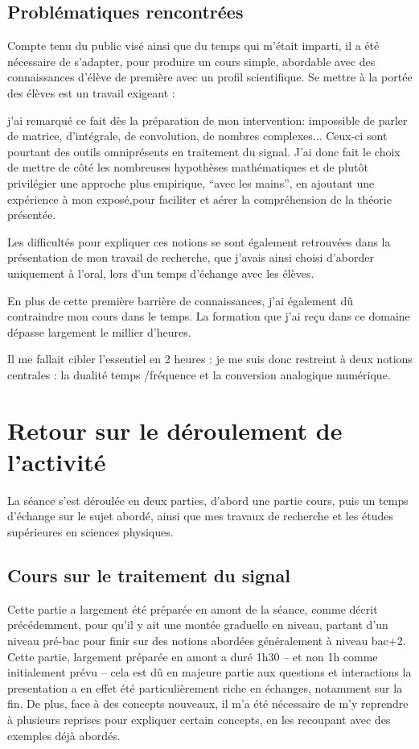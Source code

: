 \documentclass[12pt]{article}
\begin{document}
\subsection{Problématiques rencontrées}

Compte tenu du public visé ainsi que du temps qui m'était imparti, il a été nécessaire de s'adapter, pour produire un cours simple, abordable avec des connaissances d'élève de première avec un profil scientifique. Se mettre à la portée des élèves est un travail exigeant :

j'ai remarqué ce fait dès la préparation de mon intervention: impossible de parler de matrice, d'intégrale, de convolution, de nombres complexes...
Ceux-ci sont pourtant des outils omniprésents en traitement du signal.
J'ai donc fait le choix de mettre de côté les nombreuses hypothèses mathématiques et de plutôt privilégier une approche plus empirique, ``avec les mains'', en ajoutant une expérience à mon exposé,pour faciliter et aérer la compréhension de la théorie présentée.

Les difficultés pour expliquer ces notions se sont également retrouvées dans la présentation de mon travail de recherche, que j'avais ainsi choisi d'aborder uniquement à l'oral, lors d'un temps d'échange avec les élèves.

En plus de cette première barrière de connaissances, j'ai également dû contraindre mon cours dans le temps. La formation que j'ai reçu dans ce domaine dépasse largement le millier d'heures.

Il me fallait cibler l'essentiel en 2 heures : je me suis donc restreint à deux notions centrales : la dualité temps /fréquence et la conversion analogique numérique.

\section{Retour sur le déroulement de l'activité}

La séance s'est déroulée en deux parties, d'abord une partie cours, puis un temps d'échange sur le sujet abordé, ainsi que mes travaux de recherche et les études supérieures en sciences physiques.

\subsection{Cours sur le traitement du signal}

Cette partie a largement été préparée en amont de la séance, comme décrit précédemment, pour qu'il y ait une montée graduelle en niveau, partant d'un niveau pré-bac pour finir sur des notions abordées généralement à niveau bac+2.
Cette partie, largement préparée en amont a duré 1h30 -- et non 1h comme initialement prévu -- cela est dû en majeure partie aux questions et interactions la presentation a en effet été particulièrement riche en échanges, notamment sur la fin.
De plus, face à des concepts nouveaux, il m'a été nécessaire de m'y reprendre à plusieurs reprises pour expliquer certain concepts, en les recoupant avec des exemples déjà abordés.
\end{document}
